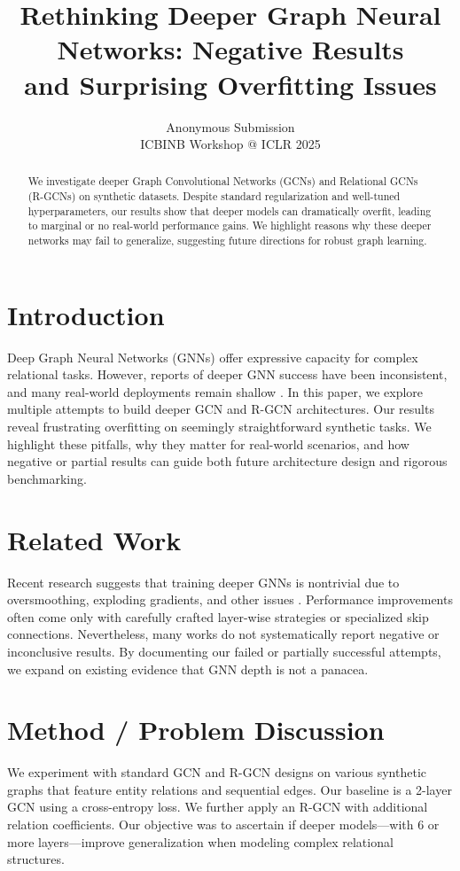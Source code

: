 \documentclass{article}
\title{Rethinking Deeper Graph Neural Networks: Negative Results \\ and Surprising Overfitting Issues}
\author{
  Anonymous Submission \\
  ICBINB Workshop @ ICLR 2025
}
\date{}
\begin{document}
\maketitle

\begin{abstract}
We investigate deeper Graph Convolutional Networks (GCNs) and Relational GCNs (R-GCNs) on synthetic datasets. Despite standard regularization and well-tuned hyperparameters, our results show that deeper models can dramatically overfit, leading to marginal or no real-world performance gains. We highlight reasons why these deeper networks may fail to generalize, suggesting future directions for robust graph learning.
\end{abstract}

\section{Introduction}
Deep Graph Neural Networks (GNNs) offer expressive capacity for complex relational tasks. However, reports of deeper GNN success have been inconsistent, and many real-world deployments remain shallow \citep{smith2018pitfalls,lee2020overfitting}. In this paper, we explore multiple attempts to build deeper GCN and R-GCN architectures. Our results reveal frustrating overfitting on seemingly straightforward synthetic tasks. We highlight these pitfalls, why they matter for real-world scenarios, and how negative or partial results can guide both future architecture design and rigorous benchmarking.

\section{Related Work}
Recent research suggests that training deeper GNNs is nontrivial due to oversmoothing, exploding gradients, and other issues \citep{lee2020overfitting,kim2021gnn}. Performance improvements often come only with carefully crafted layer-wise strategies or specialized skip connections. Nevertheless, many works do not systematically report negative or inconclusive results. By documenting our failed or partially successful attempts, we expand on existing evidence that GNN depth is not a panacea.

\section{Method / Problem Discussion}
We experiment with standard GCN and R-GCN designs on various synthetic graphs that feature entity relations and sequential edges. Our baseline is a 2-layer GCN using a cross-entropy loss. We further apply an R-GCN with additional relation coefficients. Our objective was to ascertain if deeper models---with 6 or more layers---improve generalization when modeling complex relational structures.
\end{document}
